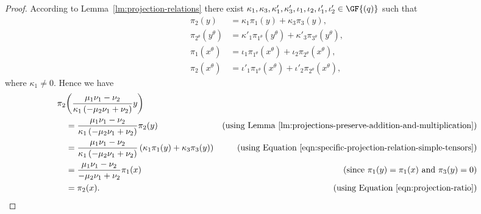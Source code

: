 \begin{proof}
According to Lemma~\ref{lm:projection-relations} there exist $\kappa_1, \kappa_3, \kappa'_1, \kappa'_3, \iota_1, \iota_2, \iota'_1, \iota'_2 \in \GF{\left(q \right)}$ such that
\begin{align}
    \pi_2{\left(y \right)} &= \kappa_1 \pi_1{\left(y \right)} + \kappa_3 \pi_3{\left(y \right)}, \label{eqn:specific-projection-relation-simple-tensors} \\
    \pi_{2^\theta}{\left(y^\theta \right)} &= \kappa'_1 \pi_{1^\theta}{\left(y^\theta \right)} + \kappa'_3 \pi_{3^\theta}{\left(y^\theta \right)}, \label{eqn:specific-projection-relation-image-simple-tensors} \\
    \pi_1{\left(x^\theta \right)} &= \iota_1 \pi_{1^\theta}{\left(x^\theta \right)} + \iota_2 \pi_{2^\theta}{\left(x^\theta \right)}, \label{eqn:pi-1-of-image} \\
    \pi_2{\left(x^\theta \right)} &= \iota'_1 \pi_{1^\theta}{\left(x^\theta \right)} + \iota'_2 \pi_{2^\theta}{\left(x^\theta \right)}, \label{eqn:pi-2-of-image}
\end{align}
where $\kappa_1 \neq 0$. Hence we have
\begin{align*}
    \pi_2&{\left(\frac{\mu_1 \nu_1 - \nu_2}{\kappa_1 \left(-\mu_2 \nu_1 + \nu_2 \right)} y \right)}  \\
    &= \frac{\mu_1 \nu_1 - \nu_2}{\kappa_1 \left(-\mu_2 \nu_1 + \nu_2 \right)} \pi_2{\left(y \right)} &\text{(using Lemma~\ref{lm:projections-preserve-addition-and-multiplication})} \\
    &= \frac{\mu_1 \nu_1 - \nu_2}{\kappa_1 \left(-\mu_2 \nu_1 + \nu_2 \right)} \left(\kappa_1 \pi_1{\left(y \right)} + \kappa_3 \pi_3{\left(y \right)} \right) &\text{(using Equation \eqref{eqn:specific-projection-relation-simple-tensors})} \\
    &= \frac{\mu_1 \nu_1 - \nu_2}{-\mu_2 \nu_1 + \nu_2} \pi_1 {\left(x \right)} &\text{(since $\pi_1{\left(y \right)} = \pi_1{\left(x \right)}$ and $\pi_3{\left(y \right)} = 0$)} \\
    &= \pi_2{\left(x \right)}. &\text{(using Equation \eqref{eqn:projection-ratio})}
\end{align*}


\end{proof}
